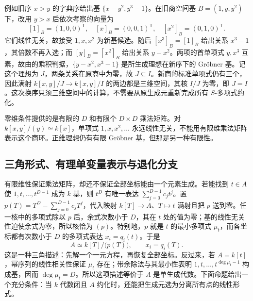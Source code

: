 \ProseParagraphBreak
例如旧序 \(x>y\) 的字典序给出基 \(\{x-y^2,y^3-1\}\)。在旧商空间基 \(B=(1,y,y^2)\) 下，改用 \(y>x\) 后依次考察的向量为
\[
	[1]_B=(1,0,0)^{\mathsf T},\quad [x]_B=(0,0,1)^{\mathsf T},\quad [x^2]_B=(0,1,0)^{\mathsf T}.
\]
它们线性无关，故接受 \(1,x,x^2\) 为新基候选。随后 \([x^3]_B=[1]_B\) 给出关系 \(x^3-1\)，其倍数不再入选；而 \([y]_B=[x^2]_B\) 给出关系 \(y-x^2\)。两项的首单项式 \(y,x^3\) 互素，故由的乘积判据，\(\{y-x^2,x^3-1\}\) 是所生成理想在新序下的 Gröbner 基。记这个理想为 \(J\)，两条关系在原商中为零，故 \(J\subseteq I\)。新商的标准单项式仍有三个，因此满射 \(k[x,y]/J\to k[x,y]/I\) 的两边都是三维空间，其核 \(I/J\) 为零，即 \(J=I\)。这次换序只须三维空间中的计算，不需要从原生成元重新完成所有 \(S\)-多项式约化。

\ProseParagraphBreak
零维条件提供的是有限的 \(D\) 和有限个 \(D\times D\) 乘法矩阵。对 \(k[x,y]/(y)\simeq k[x]\)，单项式 \(1,x,x^2,\ldots\) 永远线性无关，不能用有限维乘法矩阵表示这个商环。正维理想仍有有限 Gröbner 基，但那是另一种有限性。

\subsection{三角形式、有理单变量表示与退化分支}
\label{b3:subsec:0805:04}

有限维性保证乘法矩阵，却还不保证全部坐标能由一个元素生成。若能找到 \(t\in A\) 使 \(1,t,\ldots,t^{D-1}\) 成为 \(k\) 基，则 \(t^D\) 有唯一表达 \(\sum_{j=0}^{D-1}c_jt^j\)。置 \(p(T)=T^D-\sum_{j=0}^{D-1}c_jT^j\)，代入映射 \(k[T]\to A\)、\(T\mapsto t\) 满射且把 \(p\) 送到零。任一核中的多项式除以 \(p\) 后，余式次数小于 \(D\)，其在 \(t\) 处的值为零；基的线性无关性迫使余式为零，所以核恰为 \((p)\)。特别地，\(p\) 就是 \(t\) 的最小多项式 \(\mu_t\)，而各坐标都有次数小于 \(D\) 的多项式表达 \(x_i=q_i(t)\)。于是
\[
	A\simeq k[T]/\bigl(p(T)\bigr),\qquad x_i=q_i(T).
\]
这是一种三角描述：先解一个一元方程，再恢复全部坐标。反过来，若 \(A=k[t]\)，幂序列的线性相关性保证 \(\mu_t\) 存在；带余除法与其最小性表明 \(1,t,\ldots,t^{\deg\mu_t-1}\) 构成基，因而 \(\deg\mu_t=D\)。所以这项描述等价于 \(A\) 是单生成代数。下面命题给出一个充分条件：当 \(k\) 代数闭且 \(A\) 约化时，还能把生成元选为分离所有点的线性形式。

